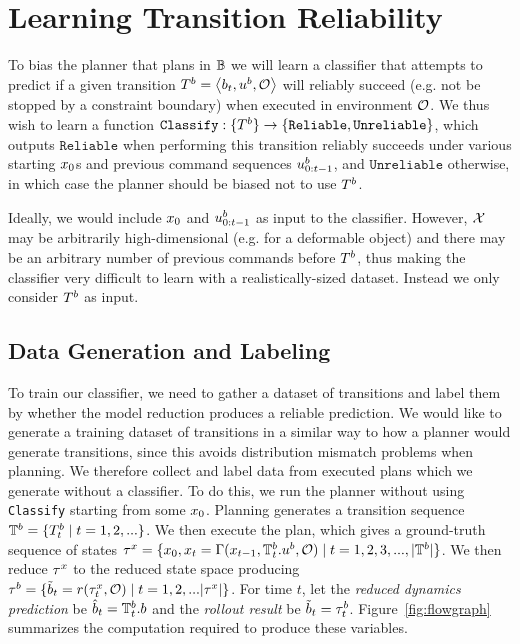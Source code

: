 
\section{Learning Transition Reliability}

To bias the planner that plans in $\mathbb{B}$ we will learn a classifier that attempts to predict if a given transition $T^b = \left<b_t,u^b,\mathcal{O}\right>$ will reliably succeed (e.g. not be stopped by a constraint boundary) when executed in environment $\mathcal{O}$. We thus wish to learn a function 
$\texttt{Classify}:\{T^b\} \rightarrow \left\{\texttt{Reliable},\texttt{Unreliable}\right\}$, which outputs $\texttt{Reliable}$ when performing this transition reliably succeeds under various starting $x_0$s and previous command sequences $u^b_{0:t-1}$, and $\texttt{Unreliable}$ otherwise, in which case the planner should be biased not to use $T^b$.

Ideally, we would include $x_0$ and $u^b_{0:t-1}$ as input to the classifier. However, $\mathcal{X}$ may be arbitrarily high-dimensional (e.g. for a deformable object) and there may be an arbitrary number of previous commands before $T^b$, thus making the classifier very difficult to learn with a realistically-sized dataset. Instead we only consider $T^b$ as input.


\subsection{Data Generation and Labeling}

To train our classifier, we need to gather a dataset of transitions and label them by whether the model reduction produces a reliable prediction. We would like to generate a training dataset of transitions in a similar way to how a planner would generate transitions, since this avoids distribution mismatch problems when planning. We therefore collect and label data from executed plans which we generate without a classifier. To do this, we run the planner without using \texttt{Classify} starting from some $x_0$. Planning generates a transition sequence $\mathbb{T}^b = \{T_t^b \mid t=1,2,...\}$. We then execute the plan, which gives a ground-truth sequence of states $\tau^x = \{x_0, x_t = \Gamma(x_{t-1},\mathbb{T}^b_t.u^b,\mathcal{O}) \mid t=1,2,3,...,|\mathbb{T}^b|\}$. We then reduce $\tau^x$ to the reduced state space producing $\tau^b = \{\tilde{b}_t=r(\tau^x_t,\mathcal{O}) \mid t=1,2,...|\tau^x|\}$. For time $t$, let the \textit{reduced dynamics prediction} be $\hat{b}_t = \mathbb{T}^b_t.b$ and the \textit{rollout result} be $\tilde{b}_t = \tau^b_t$. Figure~\ref{fig:flowgraph} summarizes the computation required to produce these variables.

